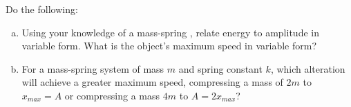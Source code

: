\label{8.4.2-3}

Do the following: 
\begin{enumerate}[(a)]	
	\item Using your knowledge of a mass-spring%
	, relate energy to amplitude in variable form.  What is the object's maximum speed in variable form?
	
	\item For a mass-spring system of mass $m$ and spring constant $k$, which alteration will achieve a greater maximum speed, compressing a mass of $2m$ to $x_{max} = A$ or compressing a mass $4m$ to $A = 2x_{max}$?
\end{enumerate}